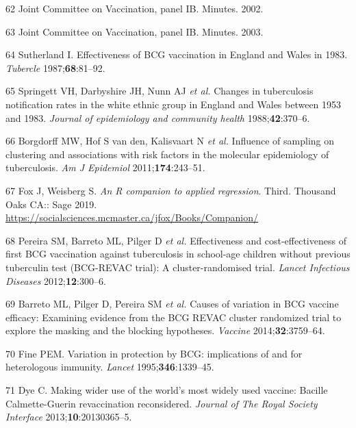 \documentclass[11pt,twoside]{bristolthesis}
\begin{document}
  \leavevmode\hypertarget{ref-JVCIBCG2002}{}%
  62 Joint Committee on Vaccination, panel IB. Minutes. 2002.
  
  \leavevmode\hypertarget{ref-JVCIBCG2003}{}%
  63 Joint Committee on Vaccination, panel IB. Minutes. 2003.
  
  \leavevmode\hypertarget{ref-Sutherland1987a}{}%
  64 Sutherland I. Effectiveness of BCG vaccination in England and Wales in 1983. \emph{Tubercle} 1987;\textbf{68}:81--92.
  
  \leavevmode\hypertarget{ref-Springett1988}{}%
  65 Springett VH, Darbyshire JH, Nunn AJ \emph{et al.} Changes in tuberculosis notification rates in the white ethnic group in England and Wales between 1953 and 1983. \emph{Journal of epidemiology and community health} 1988;\textbf{42}:370--6.
  
  \leavevmode\hypertarget{ref-Borgdorff2011}{}%
  66 Borgdorff MW, Hof S van den, Kalisvaart N \emph{et al.} Influence of sampling on clustering and associations with risk factors in the molecular epidemiology of tuberculosis. \emph{Am J Epidemiol} 2011;\textbf{174}:243--51.
  
  \leavevmode\hypertarget{ref-FoxSnow:2019}{}%
  67 Fox J, Weisberg S. \emph{An R companion to applied regression}. Third. Thousand Oaks CA:: Sage 2019. \url{https://socialsciences.mcmaster.ca/jfox/Books/Companion/}
  
  \leavevmode\hypertarget{ref-Pereira2012}{}%
  68 Pereira SM, Barreto ML, Pilger D \emph{et al.} Effectiveness and cost-effectiveness of first BCG vaccination against tuberculosis in school-age children without previous tuberculin test (BCG-REVAC trial): A cluster-randomised trial. \emph{Lancet Infectious Diseases} 2012;\textbf{12}:300--6.
  
  \leavevmode\hypertarget{ref-Barreto2014a}{}%
  69 Barreto ML, Pilger D, Pereira SM \emph{et al.} Causes of variation in BCG vaccine efficacy: Examining evidence from the BCG REVAC cluster randomized trial to explore the masking and the blocking hypotheses. \emph{Vaccine} 2014;\textbf{32}:3759--64.
  
  \leavevmode\hypertarget{ref-Fine1995}{}%
  70 Fine PEM. Variation in protection by BCG: implications of and for heterologous immunity. \emph{Lancet} 1995;\textbf{346}:1339--45.
  
  \leavevmode\hypertarget{ref-Dye2013a}{}%
  71 Dye C. Making wider use of the world's most widely used vaccine: Bacille Calmette-Guerin revaccination reconsidered. \emph{Journal of The Royal Society Interface} 2013;\textbf{10}:20130365--5.
  
\end{document}
